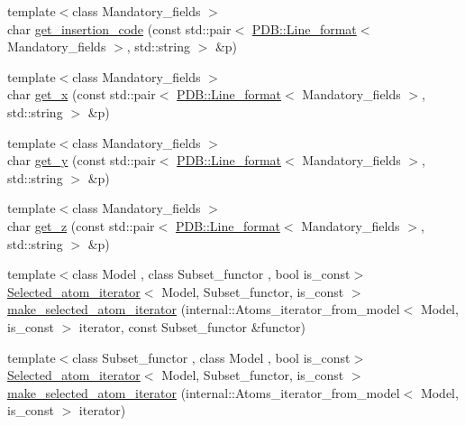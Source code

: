 \begin{DoxyCompactItemize}
\item 
{\footnotesize template$<$class Mandatory\+\_\+fields $>$ }\\char \hyperlink{namespaceESBTL_a1b3c21e82308cc135bf050dd75f684e3}{get\+\_\+insertion\+\_\+code} (const std\+::pair$<$ \hyperlink{classESBTL_1_1PDB_1_1Line__format}{P\+D\+B\+::\+Line\+\_\+format}$<$ Mandatory\+\_\+fields $>$, std\+::string $>$ \&p)
\item 
{\footnotesize template$<$class Mandatory\+\_\+fields $>$ }\\char \hyperlink{namespaceESBTL_ae67a63cb82acc8d499bf3faab539cd88}{get\+\_\+x} (const std\+::pair$<$ \hyperlink{classESBTL_1_1PDB_1_1Line__format}{P\+D\+B\+::\+Line\+\_\+format}$<$ Mandatory\+\_\+fields $>$, std\+::string $>$ \&p)
\item 
{\footnotesize template$<$class Mandatory\+\_\+fields $>$ }\\char \hyperlink{namespaceESBTL_a2d4c1122988f59eb6f5c962ddf187eee}{get\+\_\+y} (const std\+::pair$<$ \hyperlink{classESBTL_1_1PDB_1_1Line__format}{P\+D\+B\+::\+Line\+\_\+format}$<$ Mandatory\+\_\+fields $>$, std\+::string $>$ \&p)
\item 
{\footnotesize template$<$class Mandatory\+\_\+fields $>$ }\\char \hyperlink{namespaceESBTL_acb607aba6670dd7f3b42c04337d8e581}{get\+\_\+z} (const std\+::pair$<$ \hyperlink{classESBTL_1_1PDB_1_1Line__format}{P\+D\+B\+::\+Line\+\_\+format}$<$ Mandatory\+\_\+fields $>$, std\+::string $>$ \&p)
\item 
{\footnotesize template$<$class Model , class Subset\+\_\+functor , bool is\+\_\+const$>$ }\\\hyperlink{classESBTL_1_1Selected__atom__iterator}{Selected\+\_\+atom\+\_\+iterator}$<$ Model, Subset\+\_\+functor, is\+\_\+const $>$ \hyperlink{namespaceESBTL_a1f356c0519634420b8c43f23a0513402}{make\+\_\+selected\+\_\+atom\+\_\+iterator} (internal\+::\+Atoms\+\_\+iterator\+\_\+from\+\_\+model$<$ Model, is\+\_\+const $>$ iterator, const Subset\+\_\+functor \&functor)
\item 
{\footnotesize template$<$class Subset\+\_\+functor , class Model , bool is\+\_\+const$>$ }\\\hyperlink{classESBTL_1_1Selected__atom__iterator}{Selected\+\_\+atom\+\_\+iterator}$<$ Model, Subset\+\_\+functor, is\+\_\+const $>$ \hyperlink{namespaceESBTL_a1e2d083df31e32a185e592a83b4f0741}{make\+\_\+selected\+\_\+atom\+\_\+iterator} (internal\+::\+Atoms\+\_\+iterator\+\_\+from\+\_\+model$<$ Model, is\+\_\+const $>$ iterator)
\item 

\end{DoxyCompactItemize}
